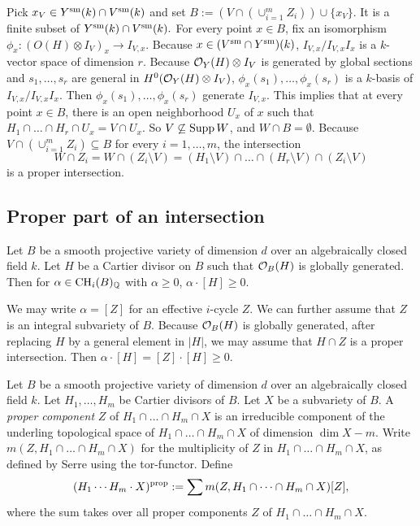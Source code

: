\documentclass[12pt]{amsart}
\begin{document}
\medskip
Pick $x_V\in Y^{{\rm sm}}(k)\cap V^{{\rm sm}}(k)$ and set $B:=(V\cap (\cup_{i=1}^m Z_i))\cup \{x_V\}$. It is a finite subset of $Y^{{\rm sm}}(k)\cap V^{{\rm sm}}(k).$
For every point $x\in B$, fix an isomorphism $\phi_x: (O(H)\otimes I_V)_x\to I_{V,x}.$  Because $x\in (V^{{\rm sm}}\cap Y^{{\rm sm}})(k)$, $I_{V,x}/ I_{V,x}I_x$ is a $k$-vector space of dimension $r.$ Because ${\mathcal O}_Y(H)\otimes I_V$ is generated by global sections and $s_1, \dots, s_r$ are general in $H^0({\mathcal O}_Y(H)\otimes I_V)$, $\phi_x(s_1), \dots, \phi_x(s_r)$ is a $k$-basis of 
$I_{V,x}/ I_{V,x}I_x$. Then $\phi_x(s_1),\dots, \phi_x(s_r)$ generate $I_{V,x}.$ This implies that at every point $x\in B$, there is an open neighborhood $U_x$ of $x$ such that $H_1\cap \dots \cap H_r\cap U_x=V\cap U_x.$ 
So $V\not\subseteq {\rm Supp} \,W$, and $W\cap B=\emptyset.$
Because $V\cap (\cup_{i=1}^m Z_i)\subseteq B$ for every $i=1,\dots, m$, 
the intersection
$$W\cap Z_i=W\cap (Z_i\setminus V)=(H_1\setminus V)\cap\dots\cap  (H_r\setminus V)\cap (Z_i\setminus V)$$ is a proper intersection.
\endproof




\subsection{Proper part of an intersection}


\begin{lem}\label{lemcutampleeff}
Let $B$ be a smooth projective variety of dimension $d$ over an algebraically closed field $k$.
Let $H$ be a Cartier divisor on $B$ such that ${\mathcal O}_B(H)$ is globally generated. 
Then for $\alpha\in {\rm CH}_i(B)_{{\mathbb Q}}$ with $\alpha\geq 0$, $\alpha\cdot [H] \geq 0.$
\end{lem}

\proof
We may write $\alpha=[Z]$ for an effective $i$-cycle $Z$. We can further assume that $Z$ is an integral subvariety of $B$. 
Because ${\mathcal O}_B(H)$ is globally generated, after replacing $H$ by a general element in $|H|$, we may assume that $H\cap Z$ is a proper intersection.
Then $\alpha\cdot [H]=[Z]\cdot [H]\geq 0.$
\endproof




\medskip 

Let $B$ be a smooth projective variety of dimension $d$ over an algebraically closed field $k$.
Let $H_1,\dots,H_m$ be Cartier divisors of $B$. Let $X$ be a subvariety of $B.$
A \emph{proper component} $Z$ of $H_1\cap \dots \cap H_m\cap X$ is an irreducible component of the underling topological space of $H_1\cap \dots \cap H_m\cap X$ of dimension $\dim X-m.$ Write $m(Z, H_1\cap \dots \cap H_m\cap X)$ for the multiplicity of $Z$ in $H_1\cap \dots \cap H_m\cap X$, as defined by Serre using the tor-functor.
Define 
$$(H_1\cdots H_m\cdot X)^{{\rm prop}}:=\sum m(Z, H_1\cap \dots \cap H_m\cap X) [Z],$$
where the  sum takes over all proper components $Z$ of $H_1\cap \dots \cap H_m\cap X$.
\end{document}
